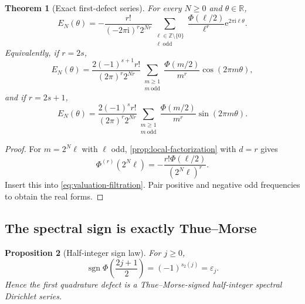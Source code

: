 \documentclass[11pt]{article}
\numberwithin{equation}{section}
\newtheorem{theorem}{Theorem}[section]
\newtheorem{proposition}[theorem]{Proposition}
\theoremstyle{definition}
\theoremstyle{remark}
\DeclareMathOperator{\sgn}{sgn}
\newcommand{\R}{\mathbb R}
\newcommand{\Z}{\mathbb Z}
\newcommand{\eps}{\varepsilon}
\newcommand{\e}{\mathrm e}
\newcommand{\iu}{\mathrm i}
\begin{document}
\begin{theorem}[Exact first-defect series]
\label{thm:first-defect}
For every $N\ge0$ and $\theta\in\R$,
\begin{equation}
 \boxed{\displaystyle
 E_N(\theta)
 =-\frac{r!}{(-2\pi\iu)^r2^{Nr}}
 \sum_{\substack{\ell\in\Z\setminus\{0\}\\\ell\ \mathrm{odd}}}
 \frac{\Phi(\ell/2)}{\ell^r}
 \e^{2\pi\iu\ell\theta}.}
 \label{eq:first-defect-complex}
\end{equation}
Equivalently, if $r=2s$,
\begin{equation}
 E_N(\theta)
 =\frac{2(-1)^{s+1}r!}{(2\pi)^r2^{Nr}}
 \sum_{\substack{m\ge1\\m\ \mathrm{odd}}}
 \frac{\Phi(m/2)}{m^r}\cos(2\pi m\theta),
 \label{eq:first-defect-even}
\end{equation}
and if $r=2s+1$,
\begin{equation}
 E_N(\theta)
 =\frac{2(-1)^sr!}{(2\pi)^r2^{Nr}}
 \sum_{\substack{m\ge1\\m\ \mathrm{odd}}}
 \frac{\Phi(m/2)}{m^r}\sin(2\pi m\theta).
 \label{eq:first-defect-odd}
\end{equation}
\end{theorem}

\begin{proof}
For $m=2^N\ell$ with $\ell$ odd, \cref{prop:local-factorization} with $d=r$ gives
\begin{equation}
 \Phi^{(r)}(2^N\ell)
 =-\frac{r!\Phi(\ell/2)}{(2^N\ell)^r}.
 \label{eq:first-zero-jet}
\end{equation}
Insert this into \eqref{eq:valuation-filtration}.  Pair positive and negative odd frequencies to obtain the real forms.
\end{proof}

\subsection{The spectral sign is exactly Thue--Morse}

\begin{proposition}[Half-integer sign law]
\label{prop:half-integer-sign}
For $j\ge0$,
\begin{equation}
 \sgn\Phi\!\left(\frac{2j+1}{2}\right)
 =(-1)^{s_2(j)}=\eps_j.
 \label{eq:half-integer-sign}
\end{equation}
Hence the first quadrature defect is a Thue--Morse-signed half-integer spectral Dirichlet series.
\end{proposition}
\end{document}

